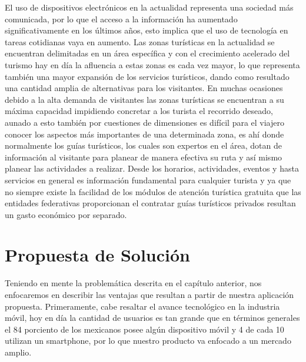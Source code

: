 	
	El uso de dispositivos electrónicos en la actualidad representa una sociedad más comunicada, por lo que el acceso a la información ha aumentado significativamente en los últimos años, esto implica que el uso de tecnología en tareas cotidianas vaya en aumento.
	Las zonas turísticas en la actualidad se encuentran delimitadas en un área específica y con el crecimiento acelerado del turismo hay en día la afluencia a estas zonas es cada vez mayor, lo que representa también una mayor expansión de los servicios turísticos, dando como resultado una cantidad amplia de alternativas para los visitantes.
	En muchas ocasiones debido a la alta demanda de visitantes las zonas turísticas se encuentran a su máxima capacidad impidiendo concretar a los turista el recorrido deseado, aunado a esto también por cuestiones de dimensiones es difícil para el viajero conocer los aspectos más importantes de una determinada zona, es ahí donde normalmente los guías turísticos, los cuales son expertos en el área, dotan de información al visitante para planear de manera efectiva su ruta y así mismo planear las actividades a realizar.
	Desde los horarios, actividades, eventos y hasta servicios en general es información fundamental para cualquier turista y ya que no siempre existe la facilidad de los módulos de atención turística gratuita que las entidades federativas proporcionan el contratar guías turísticos privados resultan un gasto económico por separado.
	
	



\section{Propuesta de Solución}



	
	Teniendo en mente la problemática descrita en el capítulo anterior, nos enfocaremos en describir las ventajas que resultan a partir de nuestra aplicación propuesta.
	Primeramente, cabe resaltar el avance tecnológico en la industria móvil, hoy en día la cantidad de usuarios es tan grande que en términos generales el 84 porciento de los mexicanos posee algún dispositivo móvil y 4 de cada 10 utilizan un smartphone, por lo que nuestro producto va enfocado a un mercado amplio.
	
